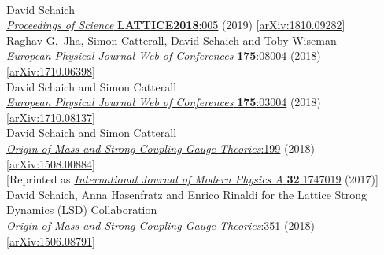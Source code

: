 \begin{spacelist}
\begin{revnumerate}
\vspace{18 pt} \hspace{-22 pt}{\large \bfseries Conference proceedings} \vspace{-8 pt}
    \pagebreakitem
       \\
      David Schaich \\
      \href{https://doi.org/10.22323/1.334.0005}{\textit{Proceedings of Science} \textbf{LATTICE2018}:005} (2019) [\href{http://arxiv.org/abs/1810.09282}{arXiv:1810.09282}]
    \pagebreakitem
       \\
      Raghav G.~Jha, Simon Catterall, David Schaich and Toby Wiseman \\
      \href{https://doi.org/10.1051/epjconf/201817508004}{\textit{European Physical Journal Web of Conferences} \textbf{175}:08004} (2018) [\href{http://arxiv.org/abs/1710.06398}{arXiv:1710.06398}]
    \pagebreakitem
       \\
      David Schaich and Simon Catterall \\
      \href{https://doi.org/10.1051/epjconf/201817503004}{\textit{European Physical Journal Web of Conferences} \textbf{175}:03004} (2018) [\href{http://arxiv.org/abs/1710.08137}{arXiv:1710.08137}]
    \pagebreakitem
       \\
      David Schaich and Simon Catterall \\
      \href{http://dx.doi.org/10.1142/9789813231467_0028}{\textit{Origin of Mass and Strong Coupling Gauge Theories}:199} (2018) [\href{http://arxiv.org/abs/1508.00884}{arXiv:1508.00884}] \\
      {[Reprinted as \href{http://dx.doi.org/10.1142/S0217751X17470194}{\textit{International Journal of Modern Physics A} \textbf{32}:1747019} (2017)]}
    \pagebreakitem
       \\
      David Schaich, Anna Hasenfratz and Enrico Rinaldi for the Lattice Strong Dynamics (LSD) Collaboration \\
      \href{http://dx.doi.org/10.1142/9789813231467_0051}{\textit{Origin of Mass and Strong Coupling Gauge Theories}:351} (2018) [\href{http://arxiv.org/abs/1506.08791}{arXiv:1506.08791}]

\end{revnumerate}
\end{spacelist}
